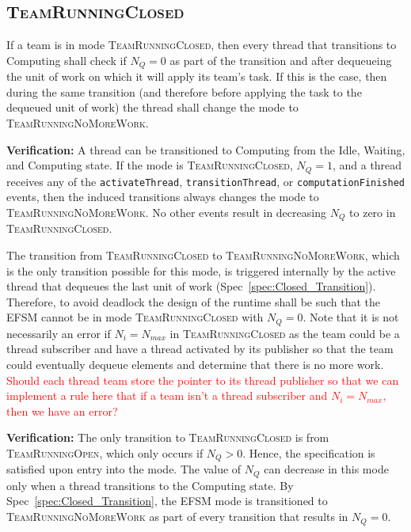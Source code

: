 \documentclass{article}
\newcommand{\TeamRunningOpen}   {\textsc{TeamRunningOpen}}
\newcommand{\TeamRunningClosed} {\textsc{TeamRunningClosed}}
\newcommand{\TeamRunningNoMoreWork} {\textsc{TeamRunningNoMoreWork}}
\begin{document}
\subsection{\TeamRunningClosed}
\begin{spec}
\label{spec:Closed_Transition}
If a team is in mode \TeamRunningClosed, then every thread that transitions to
Computing shall check if $N_Q = 0$ as part of the transition and after
dequeueing the unit of work on which it will apply its team's task.  If this is
the case, then during the same transition (and therefore before applying the
task to the dequeued unit of work) the thread shall change the mode to
\TeamRunningNoMoreWork.
\end{spec}
\textbf{Verification:}\hspace{0.125in}  A thread can be transitioned to
Computing from the Idle, Waiting, and Computing state.  If the mode is
{\TeamRunningClosed}, $N_Q = 1$, and a
thread receives any of the \texttt{activateThread}, \texttt{transitionThread},
or \texttt{computationFinished} events, then the induced transitions always changes
the mode to \TeamRunningNoMoreWork.  No other events result in decreasing $N_Q$
to zero in \TeamRunningClosed.

\begin{spec}
\label{spec:Closed_NoWork}
The transition from {\TeamRunningClosed} to \TeamRunningNoMoreWork, which is the
only transition possible for this mode, is triggered internally by the active
thread that dequeues the last unit of work (Spec~\ref{spec:Closed_Transition}).
Therefore, to avoid deadlock the design of the runtime shall be such that the
EFSM cannot be in mode {\TeamRunningClosed} with $N_Q = 0$.  Note that it is not
necessarily an error if $N_i = N_{max}$ in {\TeamRunningClosed} as the team
could be a thread subscriber and have a thread activated by its publisher so
that the team could eventually dequeue elements and determine that there is no
more work.
\textcolor{red}{Should each thread team store the pointer to its thread
publisher so that we can implement a rule here that if a team isn't a thread
subscriber and $N_i = N_{max}$, then we have an error?}
\end{spec}
\textbf{Verification:}\hspace{0.125in}  The only transition to
{\TeamRunningClosed} is from {\TeamRunningOpen}, which only occurs if $N_Q > 0$.
Hence, the specification is satisfied upon entry into the mode.  The value of
$N_Q$ can decrease in this mode only when a thread transitions to the Computing
state.   By Spec~\ref{spec:Closed_Transition}, the EFSM mode is transitioned to
{\TeamRunningNoMoreWork} as part of every transition that results in $N_Q = 0$.
\end{document}
